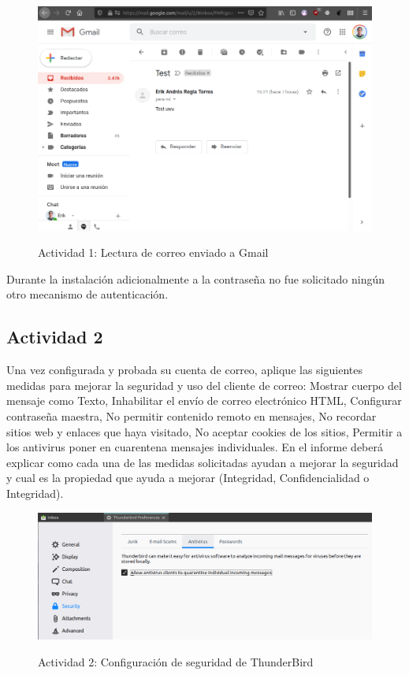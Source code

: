 \documentclass[11pt]{utalcaDoc}
\begin{document}
\begin{figure}[ht]
	\centering
	\includegraphics[width=.6\textwidth]{images/gmail1}\\
	\caption{Actividad 1: Lectura de correo enviado a Gmail}
	\label{FIG:thunderbird2}
\end{figure}

Durante la instalación adicionalmente a la contraseña no fue solicitado ningún otro mecanismo de autenticación.

\subsection{Actividad 2}{Una vez configurada y probada su cuenta de correo, aplique las siguientes medidas para mejorar la seguridad y uso del cliente de correo:
Mostrar cuerpo del mensaje como Texto,
Inhabilitar el envío de correo electrónico HTML,
Configurar contraseña maestra,
No permitir contenido remoto en mensajes,
No recordar sitios web y enlaces que haya visitado,
No aceptar cookies de los sitios,
Permitir a los antivirus poner en cuarentena mensajes individuales.
En el informe deberá explicar como cada una de las medidas solicitadas ayudan a mejorar la seguridad y cual es la propiedad que ayuda a mejorar (Integridad, Confidencialidad o Integridad).}


\begin{figure}[ht]
	\centering
	\includegraphics[width=.6\textwidth]{images/seguridad1}\\
	\caption{Actividad 2: Configuración de seguridad de ThunderBird}
	\label{FIG:seguridad1}
\end{figure}
\end{document}
